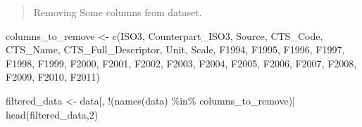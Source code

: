 \documentclass[
]{article}
\newenvironment{Shaded}{\begin{snugshade}}{\end{snugshade}}
\newcommand{\DecValTok}[1]{\textcolor[rgb]{0.00,0.00,0.81}{#1}}
\newcommand{\FunctionTok}[1]{\textcolor[rgb]{0.00,0.00,0.00}{#1}}
\newcommand{\NormalTok}[1]{#1}
\newcommand{\OtherTok}[1]{\textcolor[rgb]{0.56,0.35,0.01}{#1}}
\newcommand{\SpecialCharTok}[1]{\textcolor[rgb]{0.00,0.00,0.00}{#1}}
\newcommand{\StringTok}[1]{\textcolor[rgb]{0.31,0.60,0.02}{#1}}
\begin{document}
\begin{quote}
Removing Some columns from dataset.
\end{quote}

\begin{Shaded}
\begin{Highlighting}[]
\NormalTok{columns\_to\_remove }\OtherTok{\textless{}{-}} \FunctionTok{c}\NormalTok{(}\StringTok{\textquotesingle{}ISO3\textquotesingle{}}\NormalTok{, }\StringTok{\textquotesingle{}Counterpart\_ISO3\textquotesingle{}}\NormalTok{, }\StringTok{\textquotesingle{}Source\textquotesingle{}}\NormalTok{, }\StringTok{\textquotesingle{}CTS\_Code\textquotesingle{}}\NormalTok{, }\StringTok{\textquotesingle{}CTS\_Name\textquotesingle{}}\NormalTok{, }\StringTok{\textquotesingle{}CTS\_Full\_Descriptor\textquotesingle{}}\NormalTok{, }\StringTok{\textquotesingle{}Unit\textquotesingle{}}\NormalTok{, }\StringTok{\textquotesingle{}Scale\textquotesingle{}}\NormalTok{, }\StringTok{\textquotesingle{}F1994\textquotesingle{}}\NormalTok{, }\StringTok{\textquotesingle{}F1995\textquotesingle{}}\NormalTok{, }\StringTok{\textquotesingle{}F1996\textquotesingle{}}\NormalTok{, }\StringTok{\textquotesingle{}F1997\textquotesingle{}}\NormalTok{, }\StringTok{\textquotesingle{}F1998\textquotesingle{}}\NormalTok{, }\StringTok{\textquotesingle{}F1999\textquotesingle{}}\NormalTok{, }\StringTok{\textquotesingle{}F2000\textquotesingle{}}\NormalTok{, }\StringTok{\textquotesingle{}F2001\textquotesingle{}}\NormalTok{, }\StringTok{\textquotesingle{}F2002\textquotesingle{}}\NormalTok{, }\StringTok{\textquotesingle{}F2003\textquotesingle{}}\NormalTok{, }\StringTok{\textquotesingle{}F2004\textquotesingle{}}\NormalTok{, }\StringTok{\textquotesingle{}F2005\textquotesingle{}}\NormalTok{, }\StringTok{\textquotesingle{}F2006\textquotesingle{}}\NormalTok{, }\StringTok{\textquotesingle{}F2007\textquotesingle{}}\NormalTok{, }\StringTok{\textquotesingle{}F2008\textquotesingle{}}\NormalTok{, }\StringTok{\textquotesingle{}F2009\textquotesingle{}}\NormalTok{, }\StringTok{\textquotesingle{}F2010\textquotesingle{}}\NormalTok{, }\StringTok{\textquotesingle{}F2011\textquotesingle{}}\NormalTok{)}

\NormalTok{filtered\_data }\OtherTok{\textless{}{-}}\NormalTok{ data[, }\SpecialCharTok{!}\NormalTok{(}\FunctionTok{names}\NormalTok{(data) }\SpecialCharTok{\%in\%}\NormalTok{ columns\_to\_remove)]}
\FunctionTok{head}\NormalTok{(filtered\_data,}\DecValTok{2}\NormalTok{)}
\end{Highlighting}
\end{Shaded}
\end{document}
